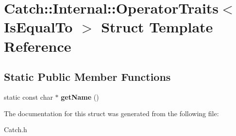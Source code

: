 \hypertarget{struct_catch_1_1_internal_1_1_operator_traits_3_01_is_equal_to_01_4}{\section{Catch\-:\-:Internal\-:\-:Operator\-Traits$<$ Is\-Equal\-To $>$ Struct Template Reference}
\label{struct_catch_1_1_internal_1_1_operator_traits_3_01_is_equal_to_01_4}
}
\subsection*{Static Public Member Functions}
\begin{DoxyCompactItemize}
\item 
\hypertarget{struct_catch_1_1_internal_1_1_operator_traits_3_01_is_equal_to_01_4_addf03ac66f0ed83abcc037a7a327d4f1}{static const char $\ast$ {\bfseries get\-Name} ()}\label{struct_catch_1_1_internal_1_1_operator_traits_3_01_is_equal_to_01_4_addf03ac66f0ed83abcc037a7a327d4f1}

\end{DoxyCompactItemize}


The documentation for this struct was generated from the following file\-:\begin{DoxyCompactItemize}
\item 
Catch.\-h\end{DoxyCompactItemize}
